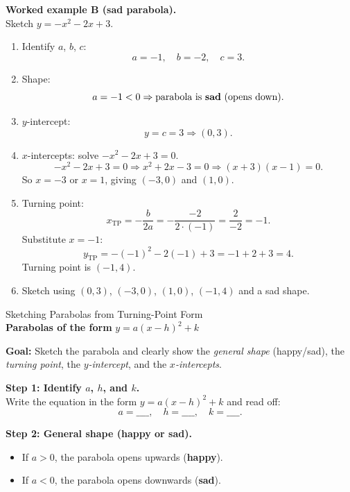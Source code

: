 \documentclass[12pt,a4paper]{article}
\begin{document}
\vspace{0.4cm}
\textbf{Worked example B (sad parabola).}\\[0.4ex]
Sketch $y = -x^2 - 2x + 3$.

\begin{enumerate}
  \item Identify $a$, $b$, $c$:
  \[
  a = -1,\quad b = -2,\quad c = 3.
  \]
  \item Shape:
  \[
  a = -1 < 0 \Rightarrow \text{parabola is \textbf{sad} (opens down).}
  \]
  \item $y$-intercept:
  \[
  y = c = 3 \Rightarrow (0,3).
  \]
  \item $x$-intercepts: solve $-x^2 - 2x + 3 = 0$.
  \[
  -x^2 - 2x + 3 = 0
  \Rightarrow x^2 + 2x - 3 = 0
  \Rightarrow (x+3)(x-1) = 0.
  \]
  So $x = -3$ or $x = 1$, giving $(-3,0)$ and $(1,0)$.
  \item Turning point:
  \[
  x_{\text{TP}} = -\frac{b}{2a}
  = -\frac{-2}{2\cdot(-1)} = \frac{2}{-2} = -1.
  \]
  Substitute $x = -1$:
  \[
  y_{\text{TP}} = -(-1)^2 - 2(-1) + 3 = -1 + 2 + 3 = 4.
  \]
  Turning point is $(-1,4)$.
  \item Sketch using $(0,3)$, $(-3,0)$, $(1,0)$, $(-1,4)$ and a sad shape.
\end{enumerate}

\newpage

\begin{center}
  {\LARGE Sketching Parabolas from Turning-Point Form}\\[0.5cm]
  \textbf{Parabolas of the form} \quad $y = a(x-h)^2 + k$
\end{center}

\textbf{Goal:} Sketch the parabola and clearly show the \emph{general shape} (happy/sad), the \emph{turning point}, the \emph{$y$-intercept}, and the \emph{$x$-intercepts}.

\vspace{0.3cm}

\textbf{Step 1: Identify $a$, $h$, and $k$.}\\[0.3ex]
Write the equation in the form $y = a(x-h)^2 + k$ and read off:
\[
a = \_\_\_\_, \quad h = \_\_\_\_, \quad k = \_\_\_\_.
\]

\textbf{Step 2: General shape (happy or sad).}\\[0.3ex]
\begin{itemize}
  \item If $a > 0$, the parabola opens upwards (\textbf{happy}).
  \item If $a < 0$, the parabola opens downwards (\textbf{sad}).
\end{itemize}
\end{document}
